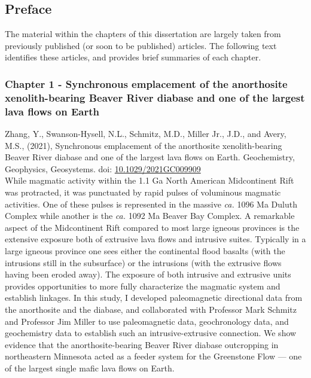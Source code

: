 \documentclass{ucbthesis}
\begin{document}
\begin{frontmatter}

\tableofcontents
\clearpage
\listoffigures
\clearpage
\listoftables

\clearpage

\chapter*{Preface}

The material within the chapters of this dissertation are largely taken from previously published (or soon to be published) articles. The following text identifies these articles, and provides brief summaries of each chapter.

\subsection{Chapter 1 - Synchronous emplacement of the anorthosite xenolith-bearing Beaver River diabase and one of the largest lava flows on Earth}

Zhang, Y., Swanson-Hysell, N.L., Schmitz, M.D., Miller Jr., J.D., and Avery, M.S., (2021), Synchronous emplacement of the anorthosite xenolith-bearing Beaver River diabase and one of the largest lava flows on Earth. Geochemistry, Geophysics, Geosystems. doi: \url{10.1029/2021GC009909}
\\

While magmatic activity within the 1.1 Ga North American Midcontinent Rift was protracted, it was punctuated by rapid pulses of voluminous magmatic activities. One of these pulses is represented in the massive \textit{ca.} 1096 Ma Duluth Complex while another is the \textit{ca.} 1092 Ma Beaver Bay Complex. A remarkable aspect of the Midcontinent Rift compared to most large igneous provinces is the extensive exposure both of extrusive lava flows and intrusive suites. Typically in a large igneous province one sees either the continental flood basalts (with the intrusions still in the subsurface) or the intrusions (with the extrusive flows having been eroded away). The exposure of both intrusive and extrusive units provides opportunities to more fully characterize the magmatic system and establish linkages. In this study, I developed paleomagnetic directional data from the anorthosite and the diabase, and collaborated with Professor Mark Schmitz and Professor Jim Miller to use paleomagnetic data, geochronology data, and geochemistry data to establish such an intrusive-extrusive connection. We show evidence that the anorthosite-bearing Beaver River diabase outcropping in northeastern Minnesota acted as a feeder system for the Greenstone Flow --- one of the largest single mafic lava flows on Earth.


\end{frontmatter}
\end{document}
